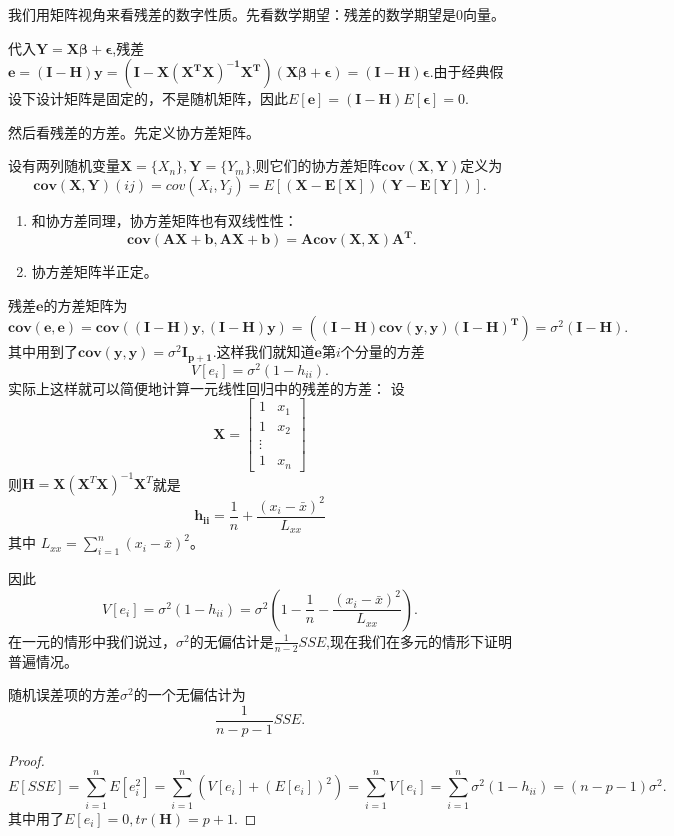 \documentclass[lang=cn,10pt]{elegantbook}
\begin{document}
    我们用矩阵视角来看残差的数字性质。先看数学期望：残差的数学期望是0向量。
    
    代入\(\mathbf{Y}=\mathbf{X\beta+\epsilon}\),残差\(\mathbf{e}=\mathbf{(I-H)y}=(\mathbf{I-\mathbf{X}(\mathbf{X}^T\mathbf{X})^{-1}\mathbf{X}^T})(\mathbf{X\beta+\epsilon})=\mathbf{(I-H)\epsilon}.\)由于经典假设下设计矩阵是固定的，不是随机矩阵，因此\(E[\mathbf{e}]=\mathbf{(I-H)}E[\mathbf{\epsilon}]=0.\)
    
    然后看残差的方差。先定义协方差矩阵。
    \begin{definition}[协方差矩阵]
        设有两列随机变量\(\mathbf{X}=\{X_n\},\mathbf{Y}=\{Y_m\}\),则它们的协方差矩阵\(\mathbf{cov(X,Y)}\)定义为\[\mathbf{cov(X,Y)}(ij)=cov(X_i,Y_j)=E[(\mathbf{X-E[X]})(\mathbf{Y-E[Y]})].\]
    \end{definition}
    \begin{property}
        \begin{enumerate}
            \item 和协方差同理，协方差矩阵也有双线性性：\[\mathbf{cov(AX+b,AX+b)}=\mathbf{Acov(X,X)A^T}.\]
            \item 协方差矩阵半正定。
        \end{enumerate}
    \end{property}
    残差\(\mathbf{e}\)的方差矩阵为
    \[\mathbf{cov(e,e)}=\mathbf{cov((I-H)y,(I-H)y)}=(\mathbf{(I-H)cov(y,y)(I-H)^T})=\sigma^2(\mathbf{I-H}).\]
    其中用到了\(\mathbf{cov(y,y)}=\sigma^2\mathbf{I_{p+1}}\).这样我们就知道\(\mathbf{e}\)第\(i\)个分量的方差
    \[V[e_i]=\sigma^2(1-h_{ii}).\]
    实际上这样就可以简便地计算一元线性回归中的残差的方差：
    设\[
    \mathbf{X}=
    \begin{bmatrix}
        1 & x_1\\
        1 & x_2\\
        \vdots\\
        1 & x_n    
    \end{bmatrix}
    \]
    则\(\mathbf{H}=\mathbf{X}(\mathbf{X}^T\mathbf{X})^{-1}\mathbf{X}^T\)就是
    $$ \mathbf{h_{ii}} = \frac{1}{n} + \frac{(x_i - \bar{x})^2}{L_{xx}} $$
    其中 $L_{xx} = \sum_{i=1}^n (x_i - \bar{x})^2$。

    因此\[V[e_i]=\sigma^2(1-h_{ii})=\sigma^2(1-\frac{1}{n} - \frac{(x_i - \bar{x})^2}{L_{xx}}).\]
    在一元的情形中我们说过，\(\sigma^2\)的无偏估计是\(\frac{1}{n-2}SSE\),现在我们在多元的情形下证明普遍情况。
    \begin{theorem}[方差的无偏估计]
        随机误差项的方差\(\sigma^2\)的一个无偏估计为
        \[\frac{1}{n-p-1}SSE.\]
    \end{theorem}
    \begin{proof}
        \[E[SSE]=\sum_{i=1}^{n}E[e_i^2]=\sum_{i=1}^{n}(V[e_i]+(E[e_i])^2)=\sum_{i=1}^{n}V[e_i]=\sum_{i=1}^{n}\sigma^2(1-h_{ii})=(n-p-1)\sigma^2.\]
        其中用了\(E[e_i]=0,tr(\mathbf{H})=p+1.\)
    \end{proof}
\end{document}
